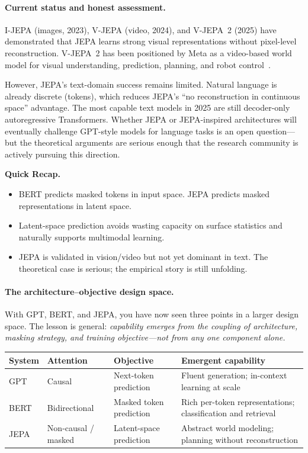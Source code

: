 \paragraph{Current status and honest assessment.}

I-JEPA (images, 2023), V-JEPA (video, 2024), and V-JEPA~2 (2025) have demonstrated that JEPA learns strong visual representations without pixel-level reconstruction. V-JEPA~2 has been positioned by Meta as a video-based world model for visual understanding, prediction, planning, and robot control~\cite{vjepa2meta2025}.

However, JEPA's text-domain success remains limited. Natural language is already discrete (tokens), which reduces JEPA's ``no reconstruction in continuous space'' advantage. The most capable text models in 2025 are still decoder-only autoregressive Transformers. Whether JEPA or JEPA-inspired architectures will eventually challenge GPT-style models for language tasks is an open question---but the theoretical arguments are serious enough that the research community is actively pursuing this direction.

\begin{quickrecap}
\textbf{Quick Recap.}
\begin{itemize}[nosep,leftmargin=1.5em]
  \item BERT predicts masked tokens in input space. JEPA predicts masked representations in latent space.
  \item Latent-space prediction avoids wasting capacity on surface statistics and naturally supports multimodal learning.
  \item JEPA is validated in vision/video but not yet dominant in text. The theoretical case is serious; the empirical story is still unfolding.
\end{itemize}
\end{quickrecap}

\paragraph{The architecture--objective design space.} With GPT, BERT, and JEPA, you have now seen three points in a larger design space. The lesson is general: \emph{capability emerges from the coupling of architecture, masking strategy, and training objective---not from any one component alone.}

\begin{center}
\begin{tabularx}{\textwidth}{@{}l l l X@{}}
\toprule
\textbf{System} & \textbf{Attention} & \textbf{Objective} & \textbf{Emergent capability} \\
\midrule
GPT & Causal & Next-token prediction & Fluent generation; in-context learning at scale \\
BERT & Bidirectional & Masked token prediction & Rich per-token representations; classification and retrieval \\
JEPA & Non-causal / masked & Latent-space prediction & Abstract world modeling; planning without reconstruction \\
\bottomrule
\end{tabularx}
\end{center}

